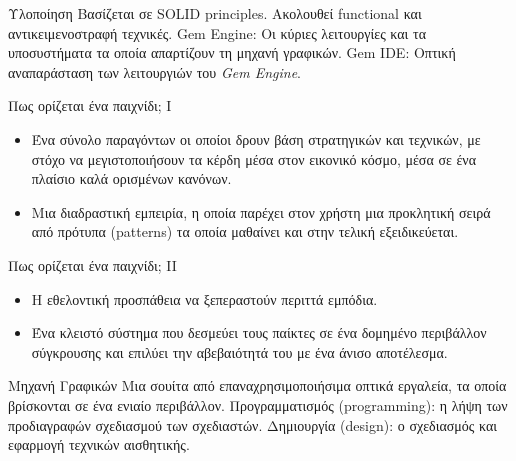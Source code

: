 \documentclass{beamer}
\begin{document}
	\begin{frame}{Υλοποίηση}
			Βασίζεται σε SOLID principles. 
			\newline
			Ακολουθεί functional και αντικειμενοστραφή τεχνικές.
			\newline 
			\newline
			\alert{Gem Engine:} Οι κύριες λειτουργίες και τα υποσυστήματα τα οποία απαρτίζουν τη μηχανή γραφικών.
			\newline
			\alert{Gem IDE:} Οπτική αναπαράσταση των λειτουργιών του \textit{Gem Engine}.
	\end{frame}			
		
	\begin{frame}{Πως ορίζεται ένα παιχνίδι; I}
		\begin{itemize}
			\item Ένα σύνολο παραγόντων οι οποίοι δρουν βάση στρατηγικών και τεχνικών, με στόχο να μεγιστοποιήσουν τα κέρδη μέσα στον εικονικό κόσμο, μέσα σε ένα πλαίσιο καλά ορισμένων κανόνων. 
			\item Mια διαδραστική εμπειρία, η οποία παρέχει στον χρήστη μια προκλητική σειρά
			από πρότυπα (patterns) τα οποία μαθαίνει και στην τελική εξειδικεύεται.
		\end{itemize}
	\end{frame}
	
	\begin{frame}{Πως ορίζεται ένα παιχνίδι; II}
		\begin{itemize}
			\item Η εθελοντική προσπάθεια να ξεπεραστούν περιττά εμπόδια.
			\item Ένα κλειστό σύστημα που δεσμεύει τους παίκτες σε ένα δομημένο περιβάλλον σύγκρουσης και επιλύει την αβεβαιότητά του με ένα άνισο αποτέλεσμα.
		\end{itemize}
	\end{frame}
	
	\begin{frame}{Mηχανή Γραφικών}		
		Mια σουίτα από επαναχρησιμοποιήσιμα οπτικά εργαλεία, τα οποία βρίσκονται σε ένα ενιαίο περιβάλλον. 
		\newline
		\newline
		\alert{Προγραμματισμός (programming)}: η λήψη των προδιαγραφών σχεδιασμού των σχεδιαστών.
		\newline
		\alert{Δημιουργία (design)}: ο σχεδιασμός και εφαρμογή τεχνικών αισθητικής.		
	\end{frame}
	
\end{document}
